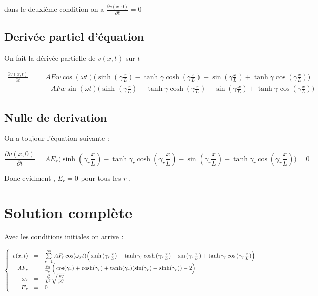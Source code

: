 \documentclass[a4paper,10pt]{report} %
\begin{document}
dans le deuxième condition on a $\frac{\partial v(x,0)}{\partial t}=0$

\subsection{Derivée partiel d'équation}

On fait la dérivée partielle de $v(x,t)$ sur $t$

\begin{align}
    \frac{\partial v(x,t)}{\partial t}=\  &AEw\cos{(\omega t)}\Big(\sinh{(\gamma\frac{x}{L})}-\tanh{\gamma}\cosh{(\gamma\frac{x}{L})}-\sin{(\gamma\frac{x}{L})}+\tanh{\gamma}\cos{(\gamma\frac{x}{L})}\Big)\\&-AFw\sin{(\omega t)}\Big(\sinh{(\gamma\frac{x}{L})}-\tanh{\gamma}\cosh{(\gamma\frac{x}{L})}-\sin{(\gamma\frac{x}{L})}+\tanh{\gamma}\cos{(\gamma\frac{x}{L})}\Big)
\end{align}


\subsection{Nulle  de derivation}

On a toujour l'équation suivante :

\begin{equation}
    \frac{\partial v(x,0)}{\partial t}=AE_r\Big(\sinh{(\gamma_r\frac{x}{L})}-\tanh{\gamma_r}\cosh{(\gamma_r\frac{x}{L})}-\sin{(\gamma_r\frac{x}{L})}+\tanh{\gamma_r}\cos{(\gamma_r\frac{x}{L})}\Big)=0
\end{equation}

Donc evidment , $E_r=0$ pour tous les $r$ .


\section{Solution complète}

Avec les conditions initiales on arrive :

\begin{equation}
    \left\{
    \begin{array}{r c l}
         v(x,t)&=&\sum\limits_{r=1}^{\infty} AF_r\cos(\omega_r t)\Big(\sinh{(\gamma_r\frac{x}{L})}-\tanh{\gamma_r}\cosh{(\gamma_r\frac{x}{L})}-\sin{(\gamma_r\frac{x}{L})}+\tanh{\gamma_r}\cos{(\gamma_r\frac{x}{L})}\Big)\\
         AF_r&=&\frac{v_0}{\gamma_r}\,\Big(\cos(\gamma_r)+\cosh(\gamma_r)+\tanh(\gamma_r)(\sin(\gamma_r)-\sinh(\gamma_r))-2\Big)\\
         \omega_r&=&\frac{\gamma_r^2}{L^2}\sqrt{\frac{EI}{\rho S}}\\
         E_r&=&0
    \end{array}
    \right.
\end{equation}
\end{document}
